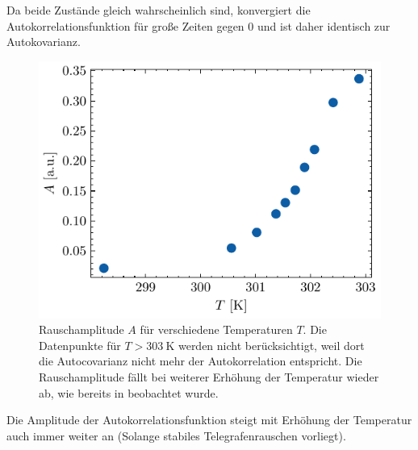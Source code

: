 \documentclass[main.tex]{subfiles}
\begin{document}
Da beide Zustände gleich wahrscheinlich sind, konvergiert die Autokorrelationsfunktion für große Zeiten gegen 0 und ist daher identisch zur Autokovarianz.

\begin{figure}[H]
    \centering
    \includegraphics{bilder/plots/temp_comparison_long/rauschamplitude.pdf}
    \caption{Rauschamplitude $A$ für verschiedene Temperaturen $T$. Die Datenpunkte für \(T > \SI{303}{\kelvin}\) werden nicht berücksichtigt, weil dort die Autocovarianz nicht mehr der Autokorrelation entspricht. 
    Die Rauschamplitude fällt bei weiterer Erhöhung der Temperatur wieder ab, wie bereits in \cite{schlegel-master} beobachtet wurde.}\label{fig:temp-autocorr-amplitude}
\end{figure}

Die Amplitude der Autokorrelationsfunktion steigt mit Erhöhung der Temperatur auch immer weiter an (Solange stabiles Telegrafenrauschen vorliegt).
\end{document}
